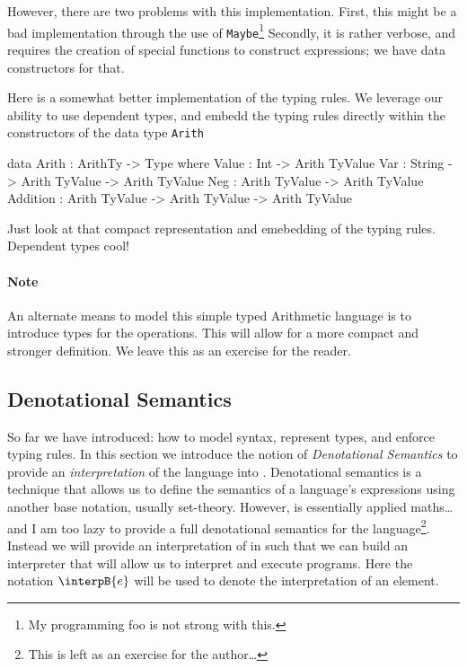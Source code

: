 \noindent
However, there are two problems with this implementation.
First, this might be a bad implementation through the use of \texttt{Maybe}\footnote{
My programming foo is not strong with this.}
Secondly, it is rather verbose, and requires the creation of special functions to construct expressions; we have data constructors for that.

Here is a somewhat better implementation of the typing rules.
We leverage our ability to use dependent types, and embedd the typing rules directly within the constructors of the data type \texttt{Arith}

\begin{code}
data Arith : ArithTy -> Type where
  Value    : Int                            -> Arith TyValue
  Var      : String        -> Arith TyValue -> Arith TyValue
  Neg      : Arith TyValue                  -> Arith TyValue
  Addition : Arith TyValue -> Arith TyValue -> Arith TyValue
\end{code}

\noindent
Just look at that compact representation and emebedding of the typing rules.
Dependent types cool!


\paragraph{Note}
An alternate means to model this simple typed Arithmetic language is to introduce types for the operations.
This will allow for a more compact and stronger definition.
We leave this as an exercise for the reader.

\subsection{Denotational Semantics}
\label{sec:typed-arith:semantics}

So far we have introduced: how to model syntax, represent types, and enforce typing rules.
In this section we introduce the notion of \emph{Denotational Semantics} to provide an \emph{interpretation} of the language into \idris{}.
Denotational semantics is a technique that allows us to define the semantics of a language's expressions using another base notation, usually set-theory.
However, \idris{} is essentially applied maths\ldots and I am too lazy to provide a full denotational semantics for the language\footnote{This is left as an exercise for the author\ldots}.
Instead  we will provide an interpretation of in \idris{} such that we can build an interpreter that will allow us to interpret and execute programs.
Here the notation $\interpB{e}$ will be used to denote the interpretation of an element.

